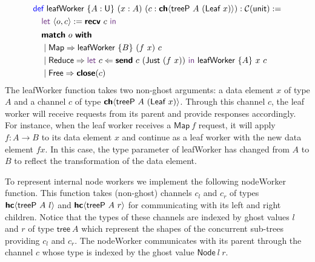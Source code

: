 \vspace{-1em}
\begingroup
\small
\addtolength{\jot}{-0.25em}
\begin{align*}
  &\Def\ \textsf{leafWorker}\ \{A : \Un\}\ (x : A)\ (c : \CH{\textsf{treeP}\ A\ (\textsf{Leaf}\ x)}) : \CM{\textsf{unit}} := \\
  &\quad\Let\ \langle{o, c}\rangle := \Recv\ c\ \In \\
  &\quad
    \begin{alignedat}{4}
      &\Match\ o\ \With\\
      &\mid \textsf{Map} \Rightarrow \textsf{leafWorker}\ \{B\}\ (f\ x)\ c \\
      &\mid \textsf{Reduce} \Rightarrow \Let\ c \Leftarrow \Send\ c\ (\textsf{Just}\ (f\ x))\ \In\ \textsf{leafWorker}\ \{A\}\ x\ c  \\
      &\mid \textsf{Free} \Rightarrow \Close(c)
    \end{alignedat}
\end{align*}
\endgroup
The \textsf{leafWorker} function takes two non-ghost arguments: a data element
$x$ of type $A$ and a channel $c$ of type
$\CH{\textsf{treeP}\ A\ (\textsf{Leaf}\ x)}$. Through this channel $c$, the leaf
worker will receive requests from its parent and provide responses accordingly.
For instance, when the leaf worker receives a $\textsf{Map}\ f$ request, it will
apply $f: A \rightarrow B$ to its data element $x$ and continue as a leaf worker
with the new data element $f x$. In this case, the type parameter of
\textsf{leafWorker} has changed from $A$ to $B$ to reflect the transformation of
the data element.

To represent internal node workers we implement the following \textsf{nodeWorker}
function. This function takes (non-ghost) channels $c_l$ and $c_r$ of
types ${\textbf{\textsf{hc}}\langle{\textsf{treeP}\ A\ l}\rangle}$ and ${\textbf{\textsf{hc}}\langle{\textsf{treeP}\ A\ r}\rangle}$ for
communicating with its left and right children. Notice that the types of these
channels are indexed by ghost values $l$ and $r$ of type $\textsf{tree}\ A$
which represent the shapes of the concurrent sub-trees providing $c_l$ and
$c_r$. The \textsf{nodeWorker} communicates with its parent through the channel
$c$ whose type is indexed by the ghost value $\textsf{Node}\ l\ r$.

